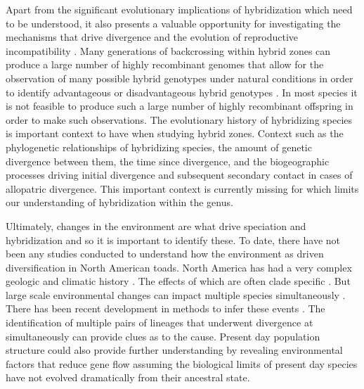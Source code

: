 Apart from the significant evolutionary implications of hybridization which 
need to be understood, it also presents a valuable opportunity for investigating 
the mechanisms that drive divergence and the evolution of reproductive
incompatibility \parencite{rieseberg1999}. 
Many generations of backcrossing within hybrid zones can produce a large number
of highly recombinant genomes that allow for the observation of many possible 
hybrid genotypes under natural conditions in order to identify advantageous or
disadvantageous hybrid genotypes \parencite{rieseberg1999}. 
In most species it is not feasible to produce such a large number of highly  
recombinant offspring in order to make such observations.
The evolutionary history of hybridizing species is important context to have 
when studying hybrid zones. 
Context such as the phylogenetic relationships of hybridizing species, 
the amount of genetic divergence between them,  
the time since divergence, and the biogeographic 
processes driving initial divergence and subsequent secondary contact in cases 
of allopatric divergence.
This important context is currently missing for \anaxyrus which limits our
understanding of hybridization within the genus.


Ultimately, changes in the environment are what drive speciation and hybridization
and so it is important to identify these.
To date, there have not been any studies conducted to understand how the 
environment as driven diversification in North American toads. 
North America has had a very complex geologic and climatic history \parencite{lyman2022}.
The effects of which are often clade specific \parencite{nunez2023}.
But large scale environmental changes can impact multiple species simultaneously \parencite{oaks2019,xue2015}.
There has been recent development in methods to infer these events \parencite{oaks2019,oaks2022}.
The identification of multiple pairs of lineages that underwent divergence at 
simultaneously can provide clues as to the cause.  
Present day population structure could also provide further understanding by 
revealing environmental factors that reduce gene flow assuming the biological 
limits of present day species have not evolved dramatically from their ancestral 
state.


